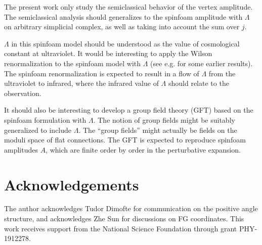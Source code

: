 \documentclass[aps,prd,notitlepage,nofootinbib,superscriptaddress,groupedaddress,twocolumn]{revtex4-1}
\newcommand{\g}{\gamma}
\renewcommand{\L }{\Lambda}
\begin{document}
The present work only study the semiclassical behavior of the vertex amplitude. The semiclassical analysis should generalizes to the spinfoam amplitude with $\L$ on arbitrary simplicial complex, as well as taking into account the sum over $j$. 

$\L$ in this spinfoam model should be understood as the value of cosmological constant at ultraviolet. It would be interesting to apply the Wilson renormalization to the spinfoam model with $\L$ (see e.g. \cite{Bahr:2018gwf} for some earlier results). The spinfoam renormalization is expected to result in a flow of $\L$ from the ultraviolet to infrared, where the infrared value of $\L$ should relate to the observation. 

It should also be interesting to develop a group field theory (GFT) based on the spinfoam formulation with $\L$. The notion of group fields might be suitably generalized to include $\L$. The ``group fields'' might actually be fields on the moduli space of flat connections. The GFT is expected to reproduce spinfoam amplitudes $A$, which are finite order by order in the perturbative expansion.  






\section*{Acknowledgements}


The author acknowledges Tudor Dimofte for communication on the positive angle structure, and acknowledges Zhe Sun for discussions on FG coordinates. This work receives support from the National Science Foundation through grant PHY-1912278.


\onecolumngrid


\appendix



\end{document}
